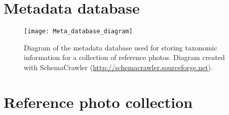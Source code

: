\documentclass[review,3p,twocolumn]{elsarticle}
\begin{document}





%

%




\appendix
\onecolumn

\section{Metadata database}
\label{sect:meta-database}

\begin{figure*}[!h]
    \centering
    \texttt{[image: Meta\_database\_diagram]}
    \caption{Diagram of the metadata database used for storing taxonomic information for a collection of reference photos. Diagram created with SchemaCrawler (\url{http://schemacrawler.sourceforge.net}).}
    \label{fig:meta-database}
\end{figure*}

\section{Reference photo collection}
\label{sect:reference-photo-collection}
\end{document}
